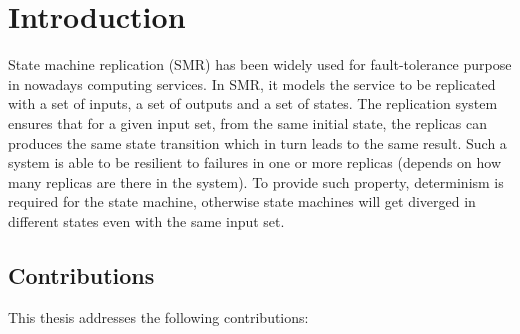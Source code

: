 \chapter{Introduction}


State machine replication (SMR) has been widely used for fault-tolerance purpose in nowadays computing services. In SMR, it models the service to be replicated with a set of inputs, a set of outputs and a set of states. The replication system ensures that for a given input set, from the same initial state, the replicas can produces the same state transition which in turn leads to the same result. Such a system is able to be resilient to failures in one or more replicas (depends on how many replicas are there in the system). To provide such property, determinism is required for the state machine, otherwise state machines will get diverged in different states even with the same input set.


\section{Contributions}

This thesis addresses the following contributions:


